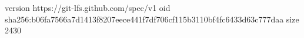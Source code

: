 version https://git-lfs.github.com/spec/v1
oid sha256:b06fa7566a7d1413f8207eece441f7df706cf115b3110bf4fc6433d63c777daa
size 2430
